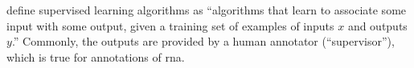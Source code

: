 


\textcite{goodfellow2016deep} define supervised learning algorithms as ``algorithms that learn to associate some input with some output, given a
training set of examples of inputs $x$ and outputs $y$.'' Commonly, the outputs are provided by a human annotator (``supervisor''), which is true for annotations of \gls{rna}.
